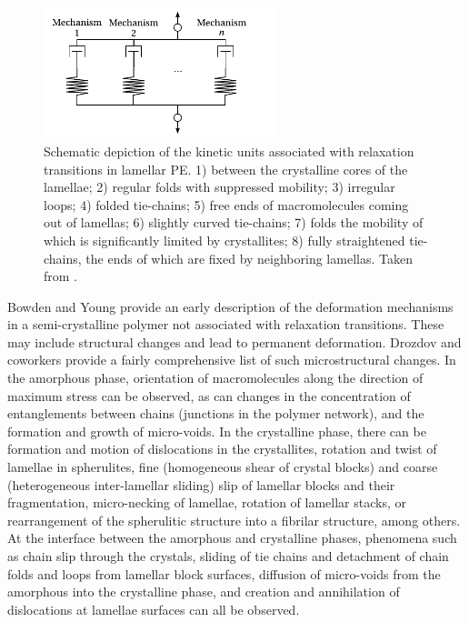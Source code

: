 \begin{figure}[hbtp]
    \centering
    \includegraphics[width=0.6\textwidth]{figures/multi_def_mechs}
    \caption{Schematic depiction of the kinetic units associated with relaxation transitions in lamellar PE. 1) between the crystalline cores of the lamellae; 2) regular folds with suppressed mobility; 3) irregular loops; 4) folded tie-chains; 5) free ends of macromolecules coming out of lamellas; 6) slightly curved tie-chains; 7) folds the mobility of which is significantly limited by crystallites; 8) fully straightened tie-chains, the ends of which are fixed by neighboring lamellas. Taken from \cite{arzhakovRelaxationPhysicalMechanical2019}.}
\label{fig:kinetic_units_relax_scp}
\end{figure}

Bowden and Young \citep{bowdenDeformationMechanismsCrystalline1974} provide an early description of the deformation mechanisms in a semi-crystalline polymer not associated with relaxation transitions.
These may include structural changes and lead to permanent deformation.
Drozdov and coworkers \citep{drozdovViscoelasticityViscoplasticityCreep2009} provide a fairly comprehensive list of such microstructural changes.
In the amorphous phase, orientation of macromolecules along the direction of maximum stress can be observed, as can changes in the concentration of entanglements between chains (junctions in the polymer network), and the formation and growth of micro-voids.
In the crystalline phase, there can be formation and motion of dislocations in the crystallites, rotation and twist of lamellae in spherulites, fine (homogeneous shear of crystal blocks) and coarse (heterogeneous inter-lamellar sliding) slip of lamellar blocks and their fragmentation, micro-necking of lamellae, rotation of lamellar stacks, or rearrangement of the spherulitic structure into a fibrilar structure, among others.
At the interface between the amorphous and crystalline phases, phenomena such as chain slip through the crystals, sliding of tie chains and detachment of chain folds and loops from lamellar block surfaces, diffusion of micro-voids from the amorphous into the crystalline phase, and creation and annihilation of dislocations at lamellae surfaces can all be observed.

